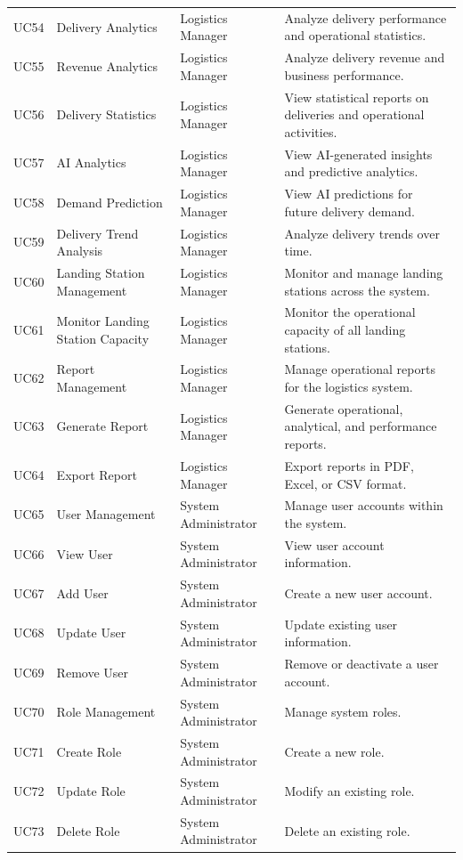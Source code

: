 \begin{longtable}{@{}p{1.3cm}p{3cm}p{2.7cm}p{6.5cm}@{}}
UC54 & Delivery Analytics & Logistics Manager & Analyze delivery performance and operational statistics. \\
UC55 & Revenue Analytics & Logistics Manager & Analyze delivery revenue and business performance. \\
UC56 & Delivery Statistics & Logistics Manager & View statistical reports on deliveries and operational activities. \\
UC57 & AI Analytics & Logistics Manager & View AI-generated insights and predictive analytics. \\
UC58 & Demand Prediction & Logistics Manager & View AI predictions for future delivery demand. \\
UC59 & Delivery Trend Analysis & Logistics Manager & Analyze delivery trends over time. \\
UC60 & Landing Station Management & Logistics Manager & Monitor and manage landing stations across the system. \\
UC61 & Monitor Landing Station Capacity & Logistics Manager & Monitor the operational capacity of all landing stations. \\
UC62 & Report Management & Logistics Manager & Manage operational reports for the logistics system. \\
UC63 & Generate Report & Logistics Manager & Generate operational, analytical, and performance reports. \\
UC64 & Export Report & Logistics Manager & Export reports in PDF, Excel, or CSV format. \\
UC65 & User Management & System Administrator & Manage user accounts within the system. \\
UC66 & View User & System Administrator & View user account information. \\
UC67 & Add User & System Administrator & Create a new user account. \\
UC68 & Update User & System Administrator & Update existing user information. \\
UC69 & Remove User & System Administrator & Remove or deactivate a user account. \\
UC70 & Role Management & System Administrator & Manage system roles. \\
UC71 & Create Role & System Administrator & Create a new role. \\
UC72 & Update Role & System Administrator & Modify an existing role. \\
UC73 & Delete Role & System Administrator & Delete an existing role. \\

\end{longtable}
